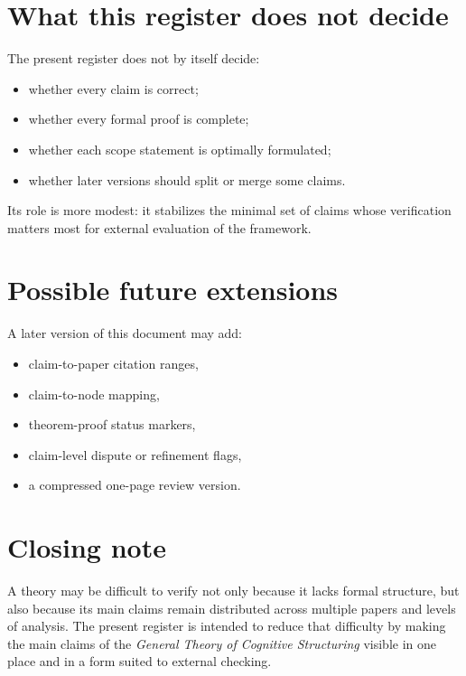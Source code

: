 \documentclass[11pt,a4paper]{article}
\begin{document}
	\section{What this register does not decide}
	
	The present register does not by itself decide:
	\begin{itemize}[leftmargin=2em]
		\item whether every claim is correct;
		\item whether every formal proof is complete;
		\item whether each scope statement is optimally formulated;
		\item whether later versions should split or merge some claims.
	\end{itemize}
	
	Its role is more modest: it stabilizes the minimal set of claims whose verification matters most
	for external evaluation of the framework.
	
	\section{Possible future extensions}
	
	A later version of this document may add:
	\begin{itemize}[leftmargin=2em]
		\item claim-to-paper citation ranges,
		\item claim-to-node mapping,
		\item theorem-proof status markers,
		\item claim-level dispute or refinement flags,
		\item a compressed one-page review version.
	\end{itemize}
	
	\section{Closing note}
	
	A theory may be difficult to verify not only because it lacks formal structure, but also because its main claims remain distributed across multiple papers and levels of analysis. The present register is intended to reduce that difficulty by making the main claims of the \emph{General Theory of Cognitive Structuring} visible in one place and in a form suited to	external checking.
\end{document}
